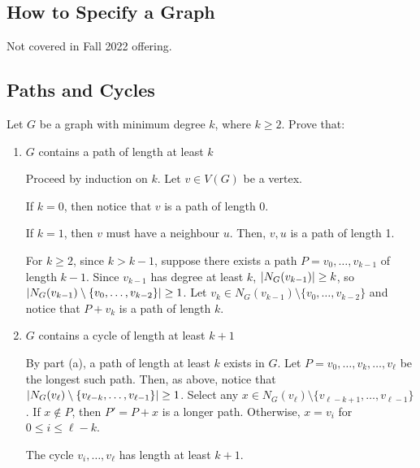 \subsection{How to Specify a Graph}

Not covered in Fall 2022 offering.

\subsection{Paths and Cycles}
\begin{xca}\label{xca:deg-path}
  Let $G$ be a graph with minimum degree $k$, where $k \geq 2$.
  Prove that:
\end{xca}
\begin{enumerate}
  \item $G$ contains a path of length at least $k$
        \begin{prf}
          Proceed by induction on $k$.
          Let $v \in V(G)$ be a vertex.

          If $k = 0$, then notice that $v$ is a path of length 0.

          If $k = 1$, then $v$ must have a neighbour $u$.
          Then, $v,u$ is a path of length 1.

          For $k \geq 2$, since $k > k-1$, suppose
          there exists a path $P = v_0,\dotsc,v_{k-1}$ of length $k-1$.
          Since $v_{k-1}$ has degree at least $k$, $\abs{N_G(v_{k-1})} \geq k$,
          so $\abs{N_G(v_{k-1}) \setminus \{v_0,\dotsc,v_{k-2}\}} \geq 1$.
          Let $v_k \in N_G(v_{k-1}) \setminus \{v_0,\dotsc,v_{k-2}\}$
          and notice that $P + v_k$ is a path of length $k$.
        \end{prf}
  \item $G$ contains a cycle of length at least $k+1$
        \begin{prf}
          By part (a), a path of length at least $k$ exists in $G$.
          Let $P = v_0,\dotsc,v_k,\dotsc,v_\ell$ be the longest such path.
          Then, as above, notice that $\abs{N_G(v_\ell) \setminus \{v_{\ell-k},\dotsc,v_{\ell-1}\}} \geq 1$.
          Select any $x \in N_G(v_\ell) \setminus \{v_{\ell-k+1},\dotsc,v_{\ell-1}\}$.
          If $x \not\in P$, then $P' = P + x$ is a longer path.
          Otherwise, $x = v_i$ for $0 \leq i \leq \ell-k$.

          The cycle $v_i,\dotsc,v_\ell$ has length at least $k+1$.
        \end{prf}
\end{enumerate}

